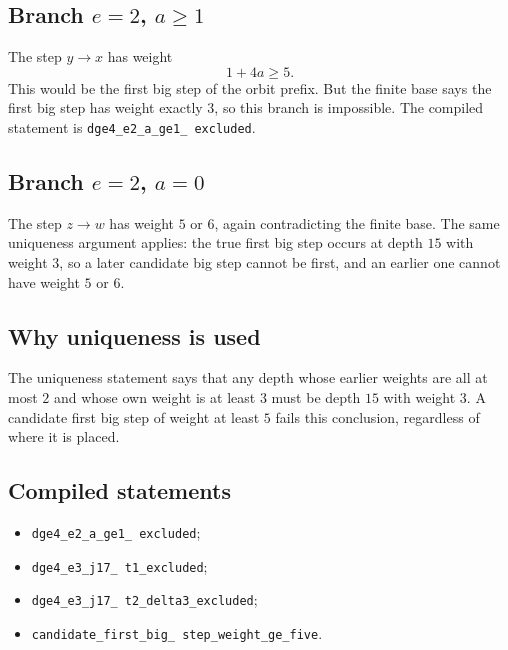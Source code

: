 \subsection{Branch $e=2$, $a\ge1$}

The step $y\to x$ has weight
\begin{equation*}
  1+4a\ge5.
\end{equation*}
This would be the first big step of the orbit prefix.  But the finite
base says the first big step has weight exactly $3$, so this branch is
impossible.  The compiled statement is
\texttt{dge4\_\allowbreak e2\_\allowbreak a\_\allowbreak ge1\_\allowbreak
excluded}.

\subsection{Branch $e=2$, $a=0$}

The step $z\to w$ has weight $5$ or $6$, again contradicting the
finite base.  The same uniqueness argument applies: the true first big
step occurs at depth $15$ with weight $3$, so a later candidate big
step cannot be first, and an earlier one cannot have weight $5$ or
$6$.

\subsection{Why uniqueness is used}

The uniqueness statement says that any depth whose earlier weights are
all at most $2$ and whose own weight is at least $3$ must be depth
$15$ with weight $3$.  A candidate first big step of weight at least
$5$ fails this conclusion, regardless of where it is placed.

\subsection{Compiled statements}

\begin{itemize}[leftmargin=*]
\item \texttt{dge4\_\allowbreak e2\_\allowbreak a\_\allowbreak ge1\_
\allowbreak excluded};
\item \texttt{dge4\_\allowbreak e3\_\allowbreak j17\_\allowbreak
t1\_\allowbreak excluded};
\item \texttt{dge4\_\allowbreak e3\_\allowbreak j17\_\allowbreak
t2\_\allowbreak delta3\_\allowbreak excluded};
\item \texttt{candidate\_\allowbreak first\_\allowbreak big\_\allowbreak
step\_\allowbreak weight\_\allowbreak ge\_\allowbreak five}.
\end{itemize}

